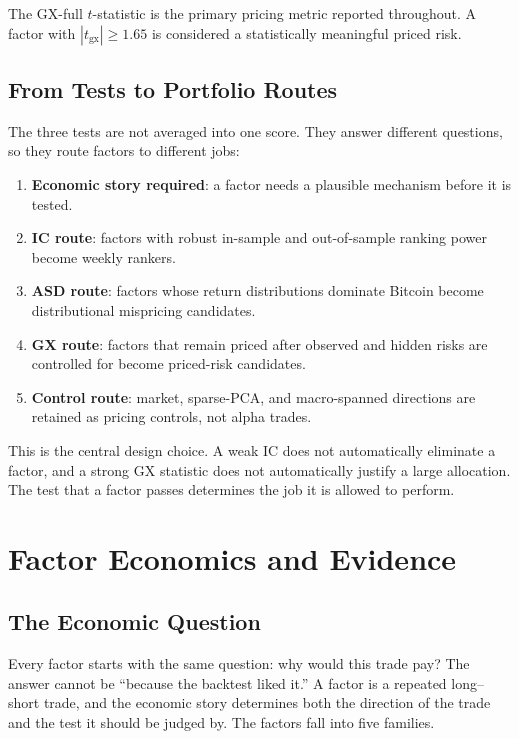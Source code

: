 \documentclass[11pt,a4paper]{article}
\begin{document}
The GX-full $t$-statistic is the primary pricing metric reported throughout. A factor with $|t_{\text{gx}}| \geq 1.65$ is considered a statistically meaningful priced risk.

\subsection{From Tests to Portfolio Routes}

The three tests are not averaged into one score. They answer different questions, so they route factors to different jobs:

\begin{enumerate}[nosep]
  \item \textbf{Economic story required}: a factor needs a plausible mechanism before it is tested.
  \item \textbf{IC route}: factors with robust in-sample and out-of-sample ranking power become weekly rankers.
  \item \textbf{ASD route}: factors whose return distributions dominate Bitcoin become distributional mispricing candidates.
  \item \textbf{GX route}: factors that remain priced after observed and hidden risks are controlled for become priced-risk candidates.
  \item \textbf{Control route}: market, sparse-PCA, and macro-spanned directions are retained as pricing controls, not alpha trades.
\end{enumerate}

This is the central design choice. A weak IC does not automatically eliminate a factor, and a strong GX statistic does not automatically justify a large allocation. The test that a factor passes determines the job it is allowed to perform.

\section{Factor Economics and Evidence}

\subsection{The Economic Question}

Every factor starts with the same question: why would this trade pay? The answer cannot be ``because the backtest liked it.'' A factor is a repeated long--short trade, and the economic story determines both the direction of the trade and the test it should be judged by. The factors fall into five families.
\end{document}
